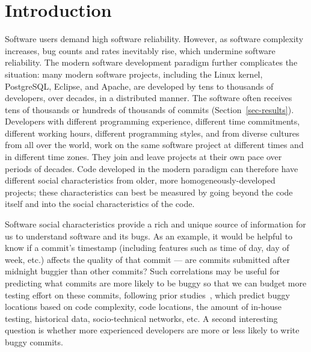  

\section{Introduction}






Software users demand high software reliability. However, as software complexity
increases, bug counts and rates inevitably rise, which undermine software
reliability. The modern software development paradigm further complicates the
situation: many modern software projects, including the Linux kernel,
PostgreSQL, Eclipse, and Apache, are developed by tens to thousands of
developers, over decades, in a distributed manner. The software often receives
tens of thousands or hundreds of thousands of commits
(Section~\ref{sec-results}). Developers with different programming experience,
different time commitments, different working hours, different programming
styles, and from diverse cultures from all over the world, work on the same
software project at different times and in different time zones. They join and
leave projects at their own pace over periods of decades. Code developed in the
modern paradigm can therefore have different social characteristics from older,
more homogeneously-developed projects; these characteristics can best be
measured by going beyond the code itself and into the social characteristics of
the code.

Software social characteristics provide a rich and unique source of information
for us to understand software and its bugs. As an example, it would be helpful
to know if a commit's timestamp (including features such as time of day, day of
week, etc.)  affects the quality of that commit --- are commits submitted after
midnight buggier than other commits?  Such correlations may be useful for
predicting what commits are more likely to be buggy so that we can budget more
testing effort on these commits, following prior
studies~\cite{graves00predicting, guo04robust, Hassan09, libre07, devNetwork08,
  predictionMenzies10, effort03, ostrand05predicting, depGraph08,
  zimmermann-promise-2007}, which predict buggy locations based on code
complexity, code locations, the amount of in-house testing, historical data,
socio-technical networks, etc. A second interesting question is whether more
experienced developers are more or less likely to write buggy commits.

